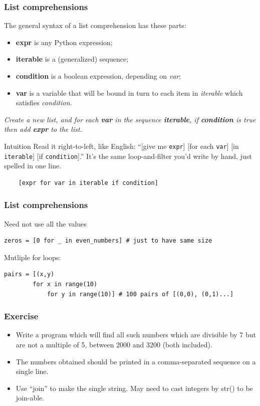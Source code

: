 \begin{frame}[fragile]\frametitle{List comprehensions}
  \def\e{\ttfamily\itshape}

  The general syntax of a list comprehension has these parts:
  \begin{itemize}
  \item{\bf expr} is any Python expression;
  \item{\bf iterable} is a (generalized) sequence;
  \item {\bf condition} is a boolean expression, depending on
    {\e var};
  \item {\bf var} is a variable that will be bound in turn to each item
    in {\e iterable} which satisfies {\e condition}.
  \end{itemize}

   \textit{Create a new list, and for each \textbf{var} in the
    sequence \textbf{iterable}, if \textbf{condition} is true then add
    \textbf{expr} to the list.}
  \begin{block}{Intuition}
  Read it right-to-left, like English: ``[give me \texttt{expr}] [for each \texttt{var}] [in \texttt{iterable}] [if \texttt{condition}].'' It's the same loop-and-filter you'd write by hand, just spelled in one line.
  \end{block}
  \begin{lstlisting}
    [expr for var in iterable if condition]
  \end{lstlisting}
\end{frame}

\begin{frame}[fragile]\frametitle{List comprehensions}
Need not use all the values
  \begin{lstlisting}
zeros = [0 for _ in even_numbers] # just to have same size
  \end{lstlisting}
Mutliple for loops:
  \begin{lstlisting}
pairs = [(x,y)
		for x in range(10)
			for y in range(10)] # 100 pairs of [(0,0), (0,1)...]
  \end{lstlisting}
\end{frame}

\begin{frame}[fragile]\frametitle{Exercise}
  \begin{itemize}
  \item Write a program which will find all such numbers which are divisible by 7 but are not a multiple of 5,
between 2000 and 3200 (both included).
  \item The numbers obtained should be printed in a comma-separated sequence on a single line.
  \item Use ``join'' to make the single string. May need to cast integers by str() to be join-able.
  \end{itemize}  
\end{frame}

